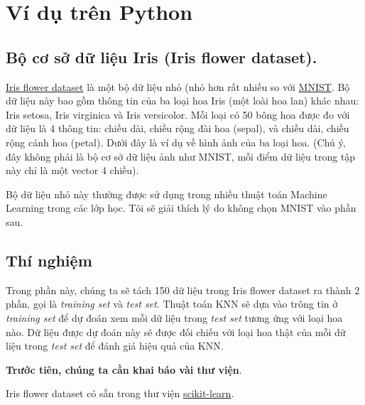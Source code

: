  
 
 
\section{Ví dụ trên Python}
 
 
 
\subsection{Bộ cơ sở dữ liệu Iris (Iris flower dataset).}
 
\href{https://en.wikipedia.org/wiki/Iris_flower_data_set}{Iris flower dataset} là một bộ dữ liệu nhỏ (nhỏ hơn rất nhiều so với \href{http://machinelearningcoban.com/2017/01/04/kmeans2/#bo-co-so-du-lieu-mnist}{MNIST}. Bộ dữ liệu này bao gồm thông tin của ba loại hoa Iris (một loài hoa lan) khác nhau: Iris setosa, Iris virginica và Iris versicolor. Mỗi loại có 50 bông hoa được đo với dữ liệu là 4 thông tin: chiều dài, chiều rộng đài hoa (sepal), và chiều dài, chiều rộng cánh hoa (petal). Dưới đây là ví dụ về hình ảnh của ba loại hoa. (Chú ý, đây không phải là bộ cơ sở dữ liệu ảnh như MNIST, mỗi điểm dữ liệu trong tập này chỉ là một vector 4 chiều).  
 
 
Bộ dữ liệu nhỏ này thường được sử dụng trong nhiều thuật toán Machine Learning trong các lớp học. Tôi sẽ giải thích lý do không chọn MNIST vào phần sau.  
 
 
 
\subsection{Thí nghiệm}
 
Trong phần này, chúng ta sẽ tách 150 dữ liệu trong Iris flower dataset ra thành 2 phần, gọi là \textit{training set} và \textit{test set}. Thuật toán KNN sẽ dựa vào trông tin ở \textit{training set} để dự đoán xem mỗi dữ liệu trong \textit{test set} tương ứng với loại hoa nào. Dữ liệu được dự đoán này sẽ được đối chiếu với loại hoa thật của mỗi dữ liệu trong \textit{test set} để đánh giá hiệu quả của KNN.  
 
\textbf{Trước tiên, chúng ta cần khai báo vài thư viện}.  
 
Iris flower dataset có sẵn trong thư viện \href{http://scikit-learn.org/}{scikit-learn}. 
 
